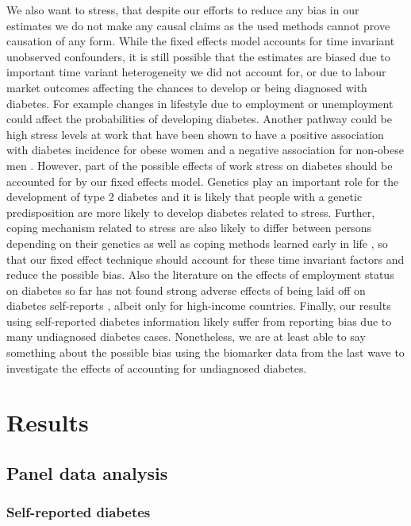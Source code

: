 \documentclass[12pt,english,british]{article}
\begin{document}
We also want to stress, that despite our efforts to reduce any bias in our estimates we do not make any causal claims as the used methods cannot prove causation of any form. While the fixed effects model accounts for time invariant
unobserved confounders, it is still possible that the estimates are biased
due to important time variant heterogeneity we did not account for, or
due to labour market outcomes affecting the chances to develop or
being diagnosed with diabetes. For example changes in lifestyle due to
employment or unemployment could affect the probabilities of developing
diabetes. Another pathway could be high stress levels at
work that have been shown to have a positive association with
diabetes incidence for obese women and a negative association for
non-obese men \citep{Heraclides2012,Eriksson2013}. However, part
of the possible effects of work stress on diabetes should be accounted
for by our fixed effects model. Genetics play an important role for
the development of type 2 diabetes and it is likely that people with
a genetic predisposition are more likely to develop diabetes related
to stress. Further, coping mechanism related to stress are also likely
to differ between persons depending on their genetics as well as coping
methods learned early in life \citep{Schneiderman2005}, so that our
fixed effect technique should account for these time invariant factors
and reduce the possible bias. Also the literature on the effects of employment
status on diabetes so far has not found strong adverse effects of being laid
off on diabetes self-reports \citep{Bergemann2011,Schaller2015},
albeit only for high-income countries. Finally, our results using self-reported diabetes information likely suffer from reporting bias due to many undiagnosed diabetes cases. Nonetheless, we are at least able to say something about the possible bias using the biomarker data from the last wave to investigate the effects of accounting for undiagnosed diabetes.




\section{\label{sec:RESULTS} Results}


\subsection{Panel data analysis}

\subsubsection*{Self-reported diabetes}
\end{document}
